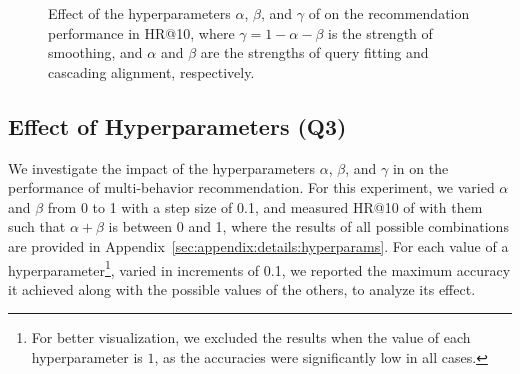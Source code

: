 \begin{figure}[t]
    \centering
    \caption{
    \label{fig:experiments:hyper_sens_split_view}
    Effect of the hyperparameters $\alpha$, $\beta$, and $\gamma$ of \method on the recommendation performance in HR@10, where $\gamma = 1 - \alpha - \beta$ is the strength of smoothing, and $\alpha$ and $\beta$ are the strengths of query fitting and cascading alignment, respectively.
    }
\end{figure}

\subsection{Effect of Hyperparameters (Q3)}
\label{sec:experiments:hyper_sens_split_view}
We investigate the impact of the hyperparameters $\alpha$, $\beta$, and $\gamma$ in \method on the performance of multi-behavior recommendation.
For this experiment, we varied $\alpha$ and $\beta$ from 0 to 1 with a step size of 0.1, and measured HR@10 of \method with them such that $\alpha + \beta$ is between 0 and 1, where the results of all possible combinations are provided in Appendix~\ref{sec:appendix:details:hyperparams}.
For each value of a hyperparameter\footnote{For better visualization, we excluded the results when the value of each hyperparameter is $1$, as the accuracies were significantly low in all cases.}, varied in increments of 0.1, we reported the maximum accuracy it achieved along with the possible values of the others, to analyze its effect.

